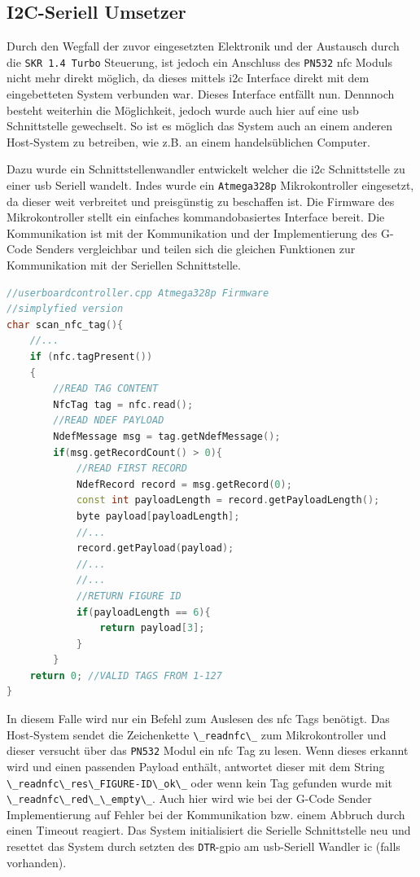 \hypertarget{i2c-seriell-umsetzer}{%
\subsection{I2C-Seriell Umsetzer}\label{i2c-seriell-umsetzer}}

Durch den Wegfall der zuvor eingesetzten Elektronik und der Austausch
durch die \passthrough{\lstinline!SKR 1.4 Turbo!} Steuerung, ist jedoch
ein Anschluss des \passthrough{\lstinline!PN532!} \gls{nfc} Moduls nicht
mehr direkt möglich, da dieses mittels \gls{i2c} Interface direkt mit
dem eingebetteten System verbunden war. Dieses Interface entfällt nun.
Dennnoch besteht weiterhin die Möglichkeit, jedoch wurde auch hier auf
eine \gls{usb} Schnittstelle gewechselt. So ist es möglich das System
auch an einem anderen Host-System zu betreiben, wie z.B. an einem
handelsüblichen Computer.

Dazu wurde ein Schnittstellenwandler entwickelt welcher die \gls{i2c}
Schnittstelle zu einer \gls{usb} Seriell wandelt. Indes wurde ein
\passthrough{\lstinline!Atmega328p!} Mikrokontroller eingesetzt, da
dieser weit verbreitet und preisgünstig zu beschaffen ist. Die Firmware
des Mikrokontroller stellt ein einfaches kommandobasiertes Interface
bereit. Die Kommunikation ist mit der Kommunikation und der
Implementierung des G-Code Senders vergleichbar und teilen sich die
gleichen Funktionen zur Kommunikation mit der Seriellen Schnittstelle.

\begin{lstlisting}[language={C++}]
//userboardcontroller.cpp Atmega328p Firmware
//simplyfied version
char scan_nfc_tag(){
    //...
    if (nfc.tagPresent())
    {
        //READ TAG CONTENT
        NfcTag tag = nfc.read();
        //READ NDEF PAYLOAD
        NdefMessage msg = tag.getNdefMessage();
        if(msg.getRecordCount() > 0){
            //READ FIRST RECORD
            NdefRecord record = msg.getRecord(0);
            const int payloadLength = record.getPayloadLength();
            byte payload[payloadLength];
            //...
            record.getPayload(payload);
            //...
            //...
            //RETURN FIGURE ID
            if(payloadLength == 6){
                return payload[3];
            }
        }
    return 0; //VALID TAGS FROM 1-127
}
\end{lstlisting}

In diesem Falle wird nur ein Befehl zum Auslesen des \gls{nfc} Tags
benötigt. Das Host-System sendet die Zeichenkette
\passthrough{\lstinline!\_readnfc\_!} zum Mikrokontroller und dieser
versucht über das \passthrough{\lstinline!PN532!} Modul ein \gls{nfc}
Tag zu lesen. Wenn dieses erkannt wird und einen passenden Payload
enthält, antwortet dieser mit dem String
\passthrough{\lstinline!\_readnfc\_res\_FIGURE-ID\_ok\_!} oder wenn kein
Tag gefunden wurde mit
\passthrough{\lstinline!\_readnfc\_red\_\_empty\_!}. Auch hier wird wie
bei der G-Code Sender Implementierung auf Fehler bei der Kommunikation
bzw. einem Abbruch durch einen Timeout reagiert. Das System
initialisiert die Serielle Schnittstelle neu und resettet das System
durch setzten des \passthrough{\lstinline!DTR!}-\gls{gpio} am
\gls{usb}-Seriell Wandler \gls{ic} (falls vorhanden).

